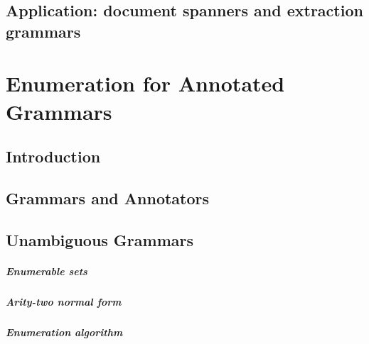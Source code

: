 \documentclass[pdftex]{pucthesis}	%
\begin{document}
\section{Application: document spanners and extraction grammars}\label{nested:sec:spanners}





\chapter[ENUMERATION FOR ANNOTATED GRAMMARS]{Enumeration for Annotated Grammars} \label{ch2}

\section{Introduction}



\section{Grammars and Annotators}\label{gram:sec:models}



\section{Unambiguous Grammars} \label{gram:sec:cubic}



\paragraph{Enumerable sets}


\paragraph{Arity-two normal form}


\paragraph{Enumeration algorithm}

\end{document}
